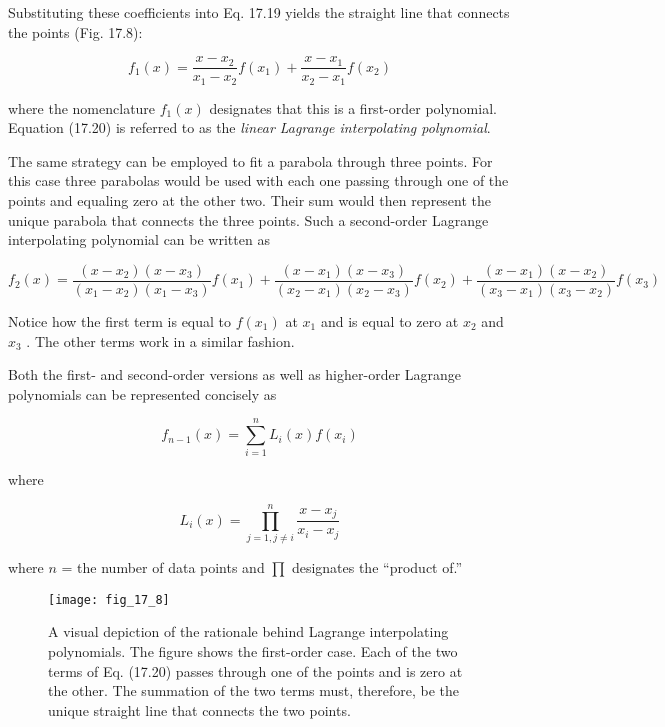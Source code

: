 \documentclass[../main.tex]{subfiles}
\begin{document}
\noindent Substituting these coefficients into Eq. 17.19 yields the straight line that connects the
points (Fig. 17.8):

\begin{equation}
	\tag{17.20}
	f_1(x) = \frac{x - x_2}{x_1 - x_2} f(x_1) + \frac{x - x_1}{x_2 - x_1} f(x_2)
\end{equation}

\noindent where the nomenclature $f_1(x)$ designates that this is a first-order polynomial. Equation (17.20) is referred to as the \textit{linear Lagrange interpolating polynomial}.

The same strategy can be employed to fit a parabola through three points. For this case
three parabolas would be used with each one passing through one of the points and equaling zero at the other two. Their sum would then represent the unique parabola that connects
the three points. Such a second-order Lagrange interpolating polynomial can be written as

\begin{equation}
	\tag{17.21}
	f_2(x) = \frac{(x - x_2) (x - x_3)}{(x_1 - x_2)(x_1 - x_3)} f(x_1) + \frac{(x - x_1) (x - x_3)}{(x_2 - x_1) (x_2 - x_3)} f(x_2) + \frac{(x - x_1) (x - x_2)}{(x_3 - x_1) (x_3 - x_2)} f(x_3)
\end{equation}

\noindent Notice how the first term is equal to $f (x_1 )$ at $x_1$ and is equal to zero at $x_2$ and $x_3$ . The other
terms work in a similar fashion.

Both the first- and second-order versions as well as higher-order Lagrange polynomials can be represented concisely as

\begin{equation}
	\tag{17.22}
	f_{n-1}(x) = \sum ^ n _ {i=1} L_i (x) f(x_i)
\end{equation}

\noindent where

\begin{equation}
	\tag{17.23}
	L_i (x) = \prod ^n _{j=1, j \neq i} \frac{x - x_j}{x_i - x_j}
\end{equation}

\noindent where $n$ = the number of data points and $\prod$ designates the ``product of.''

\begin{figure}[H] 
	\centering
	\texttt{[image: fig\_17\_8]}
	\caption{\textsf{A visual depiction of the rationale behind Lagrange interpolating polynomials. The figure shows
	the first-order case. Each of the two terms of Eq. (17.20) passes through one of the points and
	is zero at the other. The summation of the two terms must, therefore, be the unique straight line
	that connects the two points.}}
	\label{fig:fig_17_8}
\end{figure}
\end{document}

